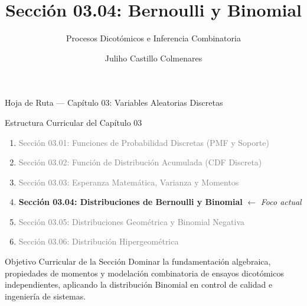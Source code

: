 \documentclass[10pt, aspectratio=169]{beamer}
\title[Bernoulli y Binomial]{Sección 03.04: Bernoulli y Binomial}
\subtitle{Procesos Dicotómicos e Inferencia Combinatoria}
\author[J. Castillo Colmenares]{Juliho Castillo Colmenares}
\institute{Tecnológico de Monterrey}
\date{\vspace{-2.0cm}}
\begin{document}
\begin{frame}[plain]
  \vspace{-0.5cm}
  \titlepage
\end{frame}

\begin{frame}{Hoja de Ruta — Capítulo 03: Variables Aleatorias Discretas}
  \begin{block}{Estructura Curricular del Capítulo 03}
    \footnotesize
    \begin{enumerate}\itemsep=0.08cm
      \item \textcolor{gray}{Sección 03.01: Funciones de Probabilidad Discretas (PMF y Soporte)}
      \item \textcolor{gray}{Sección 03.02: Función de Distribución Acumulada (CDF Discreta)}
      \item \textcolor{gray}{Sección 03.03: Esperanza Matemática, Varianza y Momentos}
      \item \textbf{\textcolor{TecRojo}{Sección 03.04: Distribuciones de Bernoulli y Binomial}} $\leftarrow$ \emph{Foco actual}
      \item \textcolor{gray}{Sección 03.05: Distribuciones Geométrica y Binomial Negativa}
      \item \textcolor{gray}{Sección 03.06: Distribución Hipergeométrica}
    \end{enumerate}
  \end{block}
  \vspace{-0.05cm}
  \pause
  \begin{alertblock}{Objetivo Curricular de la Sección}
    \footnotesize
    Dominar la fundamentación algebraica, propiedades de momentos y modelación combinatoria de ensayos dicotómicos independientes, aplicando la distribución Binomial en control de calidad e ingeniería de sistemas.
  \end{alertblock}
\end{frame}
\end{document}
